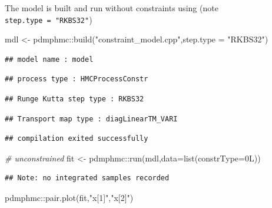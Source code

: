 \documentclass[
]{book}
\newenvironment{Shaded}{\begin{snugshade}}{\end{snugshade}}
\newcommand{\AttributeTok}[1]{\textcolor[rgb]{0.77,0.63,0.00}{#1}}
\newcommand{\CommentTok}[1]{\textcolor[rgb]{0.56,0.35,0.01}{\textit{#1}}}
\newcommand{\FunctionTok}[1]{\textcolor[rgb]{0.00,0.00,0.00}{#1}}
\newcommand{\NormalTok}[1]{#1}
\newcommand{\OtherTok}[1]{\textcolor[rgb]{0.56,0.35,0.01}{#1}}
\newcommand{\SpecialCharTok}[1]{\textcolor[rgb]{0.00,0.00,0.00}{#1}}
\newcommand{\StringTok}[1]{\textcolor[rgb]{0.31,0.60,0.02}{#1}}
\begin{document}
The model is built and run without constraints using (note \texttt{step.type\ =\ "RKBS32"})

\begin{Shaded}
\begin{Highlighting}[]
\NormalTok{mdl }\OtherTok{\textless{}{-}}\NormalTok{ pdmphmc}\SpecialCharTok{::}\FunctionTok{build}\NormalTok{(}\StringTok{"constraint\_model.cpp"}\NormalTok{,}\AttributeTok{step.type =} \StringTok{"RKBS32"}\NormalTok{)}
\end{Highlighting}
\end{Shaded}

\begin{verbatim}
## model name : model
\end{verbatim}

\begin{verbatim}
## process type : HMCProcessConstr
\end{verbatim}

\begin{verbatim}
## Runge Kutta step type : RKBS32
\end{verbatim}

\begin{verbatim}
## Transport map type : diagLinearTM_VARI
\end{verbatim}

\begin{verbatim}
## compilation exited successfully
\end{verbatim}

\begin{Shaded}
\begin{Highlighting}[]
\CommentTok{\# unconstrained}
\NormalTok{fit }\OtherTok{\textless{}{-}}\NormalTok{ pdmphmc}\SpecialCharTok{::}\FunctionTok{run}\NormalTok{(mdl,}\AttributeTok{data=}\FunctionTok{list}\NormalTok{(}\AttributeTok{constrType=}\NormalTok{0L))}
\end{Highlighting}
\end{Shaded}

\begin{verbatim}
## Note: no integrated samples recorded
\end{verbatim}

\begin{Shaded}
\begin{Highlighting}[]
\NormalTok{pdmphmc}\SpecialCharTok{::}\FunctionTok{pair.plot}\NormalTok{(fit,}\StringTok{"x[1]"}\NormalTok{,}\StringTok{"x[2]"}\NormalTok{)}
\end{Highlighting}
\end{Shaded}
\end{document}
